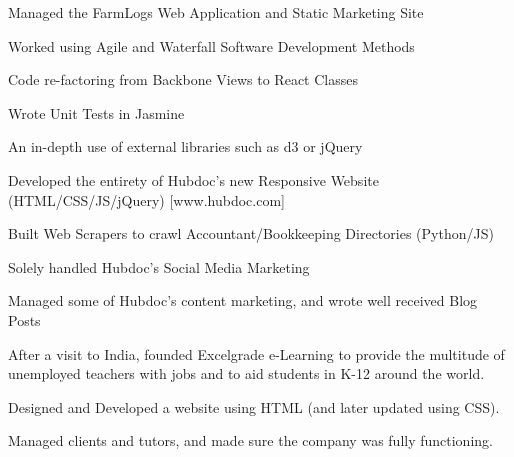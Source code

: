 \documentclass[letterpaper]{deedy-resume} %
\begin{document}
\begin{minipage}[t]{0.33\textwidth} %

\end{minipage} %
\hfill
\begin{minipage}[t]{0.66\textwidth} %


  \begin{tightitemize}
  \item Managed the FarmLogs Web Application and Static Marketing Site
  \item Worked using Agile and Waterfall Software Development Methods
  \item Code re-factoring from Backbone Views to React Classes
  \item Wrote Unit Tests in Jasmine
  \item An in-depth use of external libraries such as d3 or jQuery
  \end{tightitemize}

  \sectionspace %


  \begin{tightitemize}
  \item Developed the entirety of Hubdoc's new Responsive Website (HTML/CSS/JS/jQuery) [www.hubdoc.com]
  \item Built Web Scrapers to crawl Accountant/Bookkeeping Directories (Python/JS)
  \item Solely handled Hubdoc's Social Media Marketing
  \item Managed some of Hubdoc's content marketing, and wrote well received Blog Posts
  \end{tightitemize}

  \sectionspace %


  \vspace{\topsep} %
  \begin{tightitemize}
  \item After a visit to India, founded Excelgrade e-Learning to provide the multitude of unemployed teachers with jobs and to aid students in K-12 around the world.
  \item Designed and Developed a website using HTML (and later updated using CSS).
  \item Managed clients and tutors, and made sure the company was fully functioning.
  \end{tightitemize}


\end{minipage}
\end{document}
